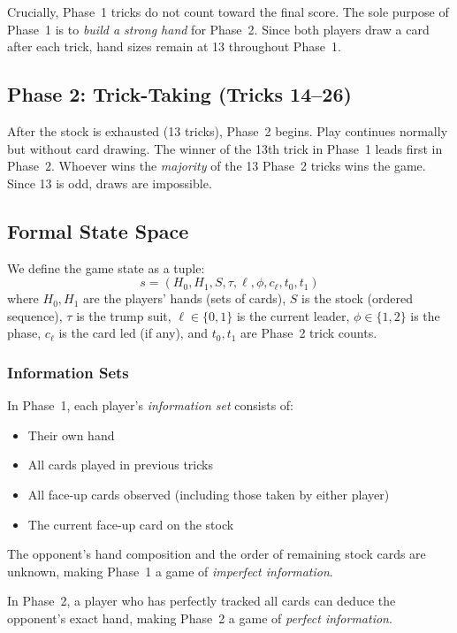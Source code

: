 Crucially, Phase~1 tricks do not count toward the final score. The sole purpose
of Phase~1 is to \emph{build a strong hand} for Phase~2. Since both players
draw a card after each trick, hand sizes remain at 13 throughout Phase~1.

\subsection{Phase 2: Trick-Taking (Tricks 14--26)}

After the stock is exhausted (13 tricks), Phase~2 begins. Play continues
normally but without card drawing. The winner of the 13th trick in Phase~1
leads first in Phase~2. Whoever wins the \emph{majority} of the 13 Phase~2
tricks wins the game. Since 13 is odd, draws are impossible.

\subsection{Formal State Space}

We define the game state as a tuple:
\[
  s = (H_0, H_1, S, \tau, \ell, \phi, c_\ell, t_0, t_1)
\]
where $H_0, H_1$ are the players' hands (sets of cards), $S$ is the stock
(ordered sequence), $\tau$ is the trump suit, $\ell \in \{0,1\}$ is the
current leader, $\phi \in \{1,2\}$ is the phase, $c_\ell$ is the card led
(if any), and $t_0, t_1$ are Phase~2 trick counts.

\subsubsection{Information Sets}

In Phase~1, each player's \emph{information set} consists of:
\begin{itemize}
  \item Their own hand
  \item All cards played in previous tricks
  \item All face-up cards observed (including those taken by either player)
  \item The current face-up card on the stock
\end{itemize}
The opponent's hand composition and the order of remaining stock cards are
unknown, making Phase~1 a game of \emph{imperfect information}.

In Phase~2, a player who has perfectly tracked all cards can deduce the
opponent's exact hand, making Phase~2 a game of \emph{perfect information}.
